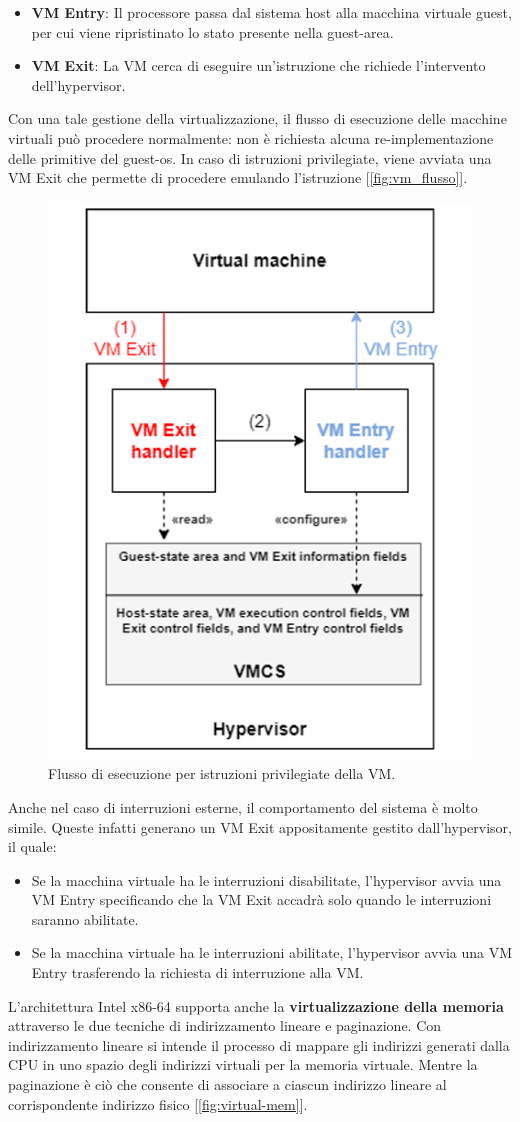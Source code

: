 \begin{itemize}
    \item \textbf{VM Entry}: Il processore passa dal sistema host alla macchina virtuale guest, per cui viene ripristinato lo stato presente nella guest-area.
    \item \textbf{VM Exit}: La VM cerca di eseguire un'istruzione che richiede l’intervento dell’hypervisor.
\end{itemize}
Con una tale gestione della virtualizzazione, il flusso di esecuzione delle macchine virtuali può procedere normalmente: non è richiesta alcuna re-implementazione delle primitive del guest-os. In caso di istruzioni privilegiate, viene avviata una VM Exit che permette di procedere emulando l'istruzione [\ref{fig:vm_flusso}].
\begin{figure}[!h]
	\centering
	\includegraphics[width=0.5\linewidth]{img/vm-flusso}
	\caption{Flusso di esecuzione per istruzioni privilegiate della VM.}
	\label{fig:vm-flusso}
\end{figure}
Anche nel caso di interruzioni esterne, il comportamento del sistema è molto simile. Queste infatti generano un VM Exit appositamente gestito dall'hypervisor, il quale:
\begin{itemize}
    \item Se la macchina virtuale ha le interruzioni disabilitate, l'hypervisor avvia una VM Entry specificando che la VM Exit accadrà solo quando le interruzioni saranno abilitate.
    \item Se la macchina virtuale ha le interruzioni abilitate, l'hypervisor avvia una VM Entry trasferendo la richiesta di interruzione alla VM.
\end{itemize}
L'architettura Intel x86-64 supporta anche la \textbf{virtualizzazione della memoria} attraverso le due tecniche di indirizzamento lineare e paginazione. Con indirizzamento lineare si intende il processo di mappare gli indirizzi generati dalla CPU in uno spazio degli indirizzi virtuali per la memoria virtuale. Mentre la paginazione è ciò che consente di associare a ciascun indirizzo lineare al corrispondente indirizzo fisico [\ref{fig:virtual-mem}].

